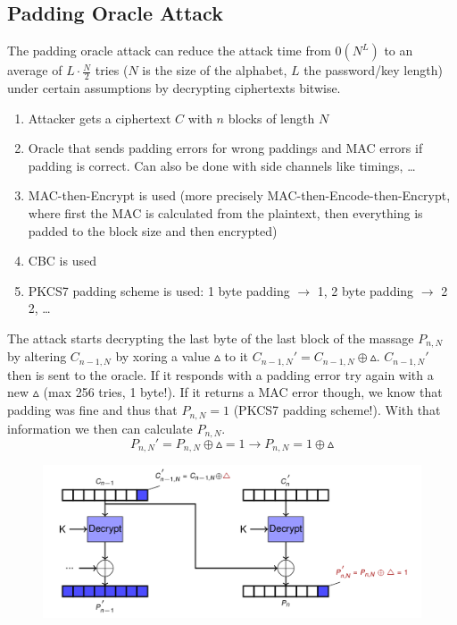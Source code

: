 \subsection{Padding Oracle Attack}
The padding oracle attack can reduce the attack time from $\mathcal{0}(N^L)$ to an average of $L \cdot \frac{N}{2}$ tries ($N$ is the size of the alphabet, $L$ the password/key length) under certain assumptions by decrypting ciphertexts bitwise.
\begin{enumerate}
  \item Attacker gets a ciphertext $C$ with $n$ blocks of length $N$
  \item Oracle that sends padding errors for wrong paddings and MAC errors if padding is correct.
    Can also be done with side channels like timings, \dots
  \item MAC-then-Encrypt is used (more precisely MAC-then-Encode-then-Encrypt, where first the MAC is calculated from the plaintext, then everything is padded to the block size and then encrypted)
  \item CBC is used
  \item PKCS7 padding scheme is used: 1 byte padding $\rightarrow$ 1, 2 byte padding $\rightarrow$ 2 2, \dots
\end{enumerate}

The attack starts decrypting the last byte of the last block of the massage $P_{n,N}$ by altering $C_{n-1,N}$ by xoring a value $\vartriangle$ to it $C_{n-1,N}' = C_{n-1,N} \oplus \vartriangle$.
$C_{n-1,N}'$ then is sent to the oracle.
If it responds with a padding error try again with a new $\vartriangle$ (max 256 tries, 1 byte!).
If it returns a MAC error though, we know that padding was fine and thus that $P_{n,N} = 1$ (PKCS7 padding scheme!).
With that information we then can calculate $P_{n,N}$.
\begin{equation*}
  P_{n,N}' = P_{n,N} \oplus \vartriangle = 1 \rightarrow P_{n,N} = 1 \oplus \vartriangle
\end{equation*}

\begin{figure}[H]
  \centering
  \includegraphics[width=.8\textwidth]{figures/padding_oracle_attack.png}
\end{figure}

